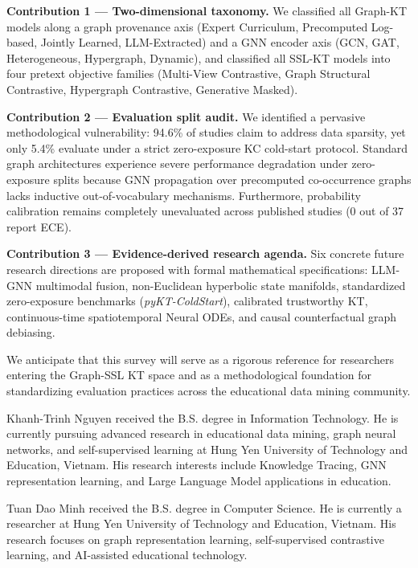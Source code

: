 \documentclass[journal]{IEEEtran}
\begin{document}
\textbf{Contribution 1 --- Two-dimensional taxonomy.} We classified all Graph-KT models along a graph provenance axis (Expert Curriculum, Precomputed Log-based, Jointly Learned, LLM-Extracted) and a GNN encoder axis (GCN, GAT, Heterogeneous, Hypergraph, Dynamic), and classified all SSL-KT models into four pretext objective families (Multi-View Contrastive, Graph Structural Contrastive, Hypergraph Contrastive, Generative Masked).

\textbf{Contribution 2 --- Evaluation split audit.} We identified a pervasive methodological vulnerability: 94.6\% of studies claim to address data sparsity, yet only 5.4\% evaluate under a strict zero-exposure KC cold-start protocol. Standard graph architectures experience severe performance degradation under zero-exposure splits because GNN propagation over precomputed co-occurrence graphs lacks inductive out-of-vocabulary mechanisms. Furthermore, probability calibration remains completely unevaluated across published studies (0 out of 37 report ECE).

\textbf{Contribution 3 --- Evidence-derived research agenda.} Six concrete future research directions are proposed with formal mathematical specifications: LLM-GNN multimodal fusion, non-Euclidean hyperbolic state manifolds, standardized zero-exposure benchmarks (\textit{pyKT-ColdStart}), calibrated trustworthy KT, continuous-time spatiotemporal Neural ODEs, and causal counterfactual graph debiasing.

We anticipate that this survey will serve as a rigorous reference for researchers entering the Graph-SSL KT space and as a methodological foundation for standardizing evaluation practices across the educational data mining community.




\begin{IEEEbiographynophoto}{Khanh-Trinh Nguyen}
received the B.S. degree in Information Technology. He is currently pursuing advanced research in educational data mining, graph neural networks, and self-supervised learning at Hung Yen University of Technology and Education, Vietnam. His research interests include Knowledge Tracing, GNN representation learning, and Large Language Model applications in education.
\end{IEEEbiographynophoto}

\begin{IEEEbiographynophoto}{Tuan Dao Minh}
received the B.S. degree in Computer Science. He is currently a researcher at Hung Yen University of Technology and Education, Vietnam. His research focuses on graph representation learning, self-supervised contrastive learning, and AI-assisted educational technology.
\end{IEEEbiographynophoto}
\end{document}
